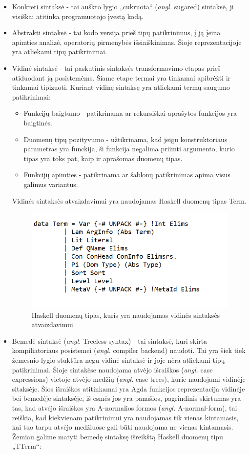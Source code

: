 \documentclass{VUMIFPSbakalaurinis}
\begin{document}
\begin{itemize}
	\item Konkreti sintaksė - tai auškto lygio „cukruota“ (\textit{angl.} sugared) sintaksė, ji visiškai atitinka programuotojo įvestą kodą.
	\item Abstrakti sintaksė - tai kodo versija prieš tipų patikrinimus, į ją įeina apimties analizė, operatorių pirmenybės išsiaiškinimas. Šioje reprezentacijoje yra atliekami tipų patikrinimai.
	\item Vidinė sintaksė - tai paskutinis sintaksės transformavimo etapas prieš atiduodant ją posistemėms. Šiame etape termai yra tinkamai apibrėžti ir tinkamai tipizuoti. Kuriant vidinę sintaksę yra atliekami termų saugumo patikrinimai:
	\begin{itemize}
		\item Funkcijų baigtumo - patikrinama ar rekursiškai aprašytos funkcijos yra baigtinės.
		\item Duomenų tipų pozityvumo - užtikrinama, kad jeigu konstruktoriaus parametras yra funckija, ši funkcija negalima priimti argumento, kurio tipas yra toks pat, kaip ir aprašomas duomenų tipas.
		\item Funkcijų apimties - patikrinama ar šablonų patikrinimas apima visus galimus variantus.
	\end{itemize}
	Vidinės sintaksės atvaizdavimui yra naudojamas Haskell duomenų tipas Term.
	\begin{figure}[H]
		\centering
		\includegraphics{HaskellTerm.png}
		\caption{Haskell duomenų tipas, kuris yra naudojamas vidinės sintaksės atvaizdavimui}
		\centering
		\end{figure}
		\item Bemedė sintaksė (\textit{angl.} Treeless syntax) - tai sintaksė, kuri skirta kompiliatoriaus posistemei (\textit{angl.} compiler backend) naudoti. Tai yra šiek tiek žemesnio lygio stuktūra negu vidinė sintaksė ir joje nėra atliekami tipų patikrinimai. Šioje sintakėse naudojama atvėjo išraiškos (\textit{angl.} case expressions) vietoje atvėjo medžių (\textit{angl.} case trees), kurie naudojami vidinėje sitaksėje. Šios išraiškos atitinkamai yra Agda funkcijos reprezentacija vidinėje bei bemedėje sintaksėje, iš esmės jos yra panašios, pagrindinis skirtumas yra tas, kad atvėjo išraiškos yra A-normalios formos (\textit{angl.} A-normal-form), tai reiškia, kad kiekvienam patikrinimui yra naudojamas tik vienas kintamasis, kai tuo tarpu atvėjo medžiuose gali būti naudojama ne vienas kintamasis. Žemiau galime matyti bemedę sintaksę išreikštą Haskell duomenų tipu „TTerm“:

\end{itemize}
\end{document}
